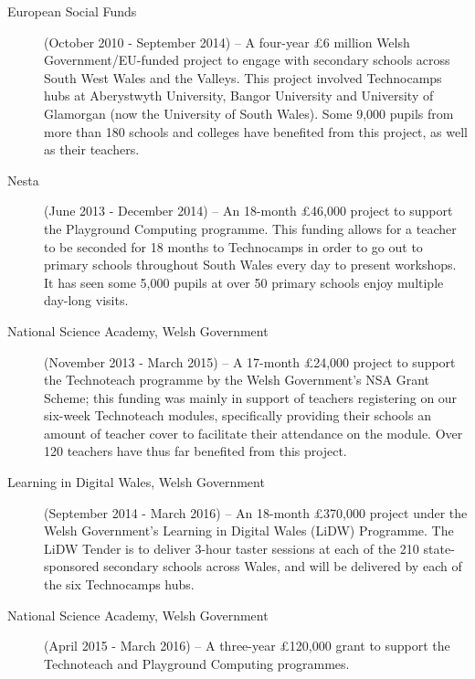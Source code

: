 \documentclass{sig-alternate}
\begin{document}
\begin{description}
\item[European Social Funds] (October 2010 - September 2014) --
A four-year \pounds 6 million Welsh Government/EU-funded project to
engage with secondary schools across South West Wales and the
Valleys. This project involved Technocamps hubs at Aberystwyth
University, Bangor University and University of Glamorgan (now the
University of South Wales). Some 9,000 pupils from more than 180
schools and colleges have benefited from this project, as well as
their teachers.

\item[Nesta] (June 2013 - December 2014) --
An 18-month \pounds 46,000 project to support the Playground Computing
programme. This funding allows for a teacher to be seconded for 18
months to Technocamps in order to go out to primary schools throughout
South Wales every day to present workshops. It has seen some 5,000
pupils at over 50 primary schools enjoy multiple day-long visits.

\item[National Science Academy, Welsh Government] (November 2013 - March 2015) --
A 17-month \pounds 24,000 project to support the Technoteach programme
by the Welsh Government's NSA Grant Scheme; this funding was mainly in
support of teachers registering on our six-week Technoteach modules,
specifically providing their schools an amount of teacher cover to
facilitate their attendance on the module. Over 120 teachers have thus
far benefited from this project.

\item[Learning in Digital Wales, Welsh Government] (September 2014 - March 2016) --
An 18-month \pounds 370,000 project under the Welsh Government's
Learning in Digital Wales (LiDW) Programme. The LiDW Tender is to
deliver 3-hour taster sessions at each of the 210 state-sponsored
secondary schools across Wales, and will be delivered by each of the
six Technocamps hubs.

\item[National Science Academy, Welsh Government] (April 2015 - March 2016) -- 
A three-year \pounds 120,000 grant to support the Technoteach and
Playground Computing programmes.
\end{description}
\end{document}
